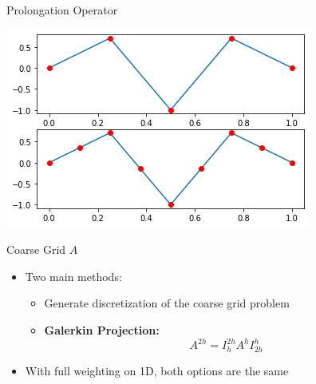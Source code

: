 \documentclass[11pt]{beamer}
\begin{document}
\begin{frame}{Prolongation Operator}
  \begin{center}
    \includegraphics[width=\linewidth]{output_24_1.png}
  \end{center}
\end{frame}
\begin{frame}{Coarse Grid $A$}
  \begin{itemize}
  \item Two main methods:
    \begin{itemize}
    \item Generate discretization of the coarse grid problem
    \item \textbf{Galerkin Projection: }\[
        A^{2h} = I_h^{2h} A^h I_{2h}^h
      \]
    \end{itemize}
  \item With full weighting on 1D, both options are the same
  \end{itemize}
\end{frame}
\end{document}
